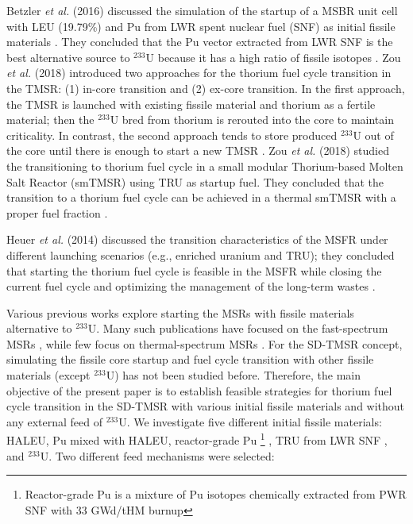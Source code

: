 Betzler \emph{et al.} (2016) discussed the simulation of the startup of a \gls{MSBR} unit
cell with \gls{LEU} (19.79\%) and Pu from \gls{LWR} spent nuclear fuel (SNF) as initial
fissile materials \cite{betzler2016modeling}. They concluded that the 
Pu vector extracted from LWR SNF is the best alternative source to 
$^{233}$U because it has a high ratio of fissile isotopes
\cite{betzler2016modeling}. Zou \emph{et al.} (2018) introduced two approaches for
the thorium fuel cycle transition in the \gls{TMSR}: (1) in-core transition and 
(2) ex-core transition. In the first approach, the TMSR is launched with 
existing fissile material and thorium as a fertile material; then the 
$^{233}$U bred from thorium is rerouted into the core to maintain criticality. 
In contrast, the second approach tends to store produced $^{233}$U out of the 
core until there is enough to start a new TMSR \cite{zou2018transition}.
Zou \emph{et al.} (2018) studied the transitioning to thorium fuel
cycle in a small modular Thorium-based Molten Salt Reactor (smTMSR) using \gls{TRU}
as startup fuel. They concluded that the transition to a thorium fuel cycle can
be achieved in a thermal smTMSR with a proper fuel fraction 
\cite{zou2018preliminary}.

Heuer \emph{et al.} (2014) discussed the transition characteristics of the \gls{MSFR}
under different launching scenarios (e.g., enriched uranium and TRU); they concluded that starting the thorium fuel cycle is feasible in the MSFR while closing the current fuel cycle and optimizing the management of the long-term wastes \cite{heuer2014towards}.

Various previous works explore starting the
\glspl{MSR} with fissile materials alternative to $^{233}$U. Many such publications have focused on the fast-spectrum \glspl{MSR} \cite{heuer2014towards,ashraf2019modeling,
	ashraf2018nuclear, rykhlevskii_fuel_2019, betzler_impacts_2019,
	fiorina2013investigation}, while few focus on
thermal-spectrum \glspl{MSR} \cite{betzler2016modeling,
	zou2018transition,zou2018preliminary}. For the SD-TMSR concept, simulating the fissile core startup and fuel cycle transition with other
fissile materials (except $^{233}$U) has not been studied before. Therefore,
the main objective of the present paper is to establish feasible strategies for thorium fuel cycle transition in the \gls{SD-TMSR} with
various initial fissile materials and without any external feed of $^{233}$U. We investigate five different
initial fissile materials: \gls{HALEU}, Pu mixed with \gls{HALEU}, reactor-grade Pu \footnote{Reactor-grade Pu is a mixture of Pu isotopes chemically extracted from PWR SNF with 33 GWd/tHM burnup} \cite{marka1993explosive}, \gls{TRU} from LWR SNF \cite{de2000scenarios}, and $^{233}$U. Two different feed mechanisms were selected:

